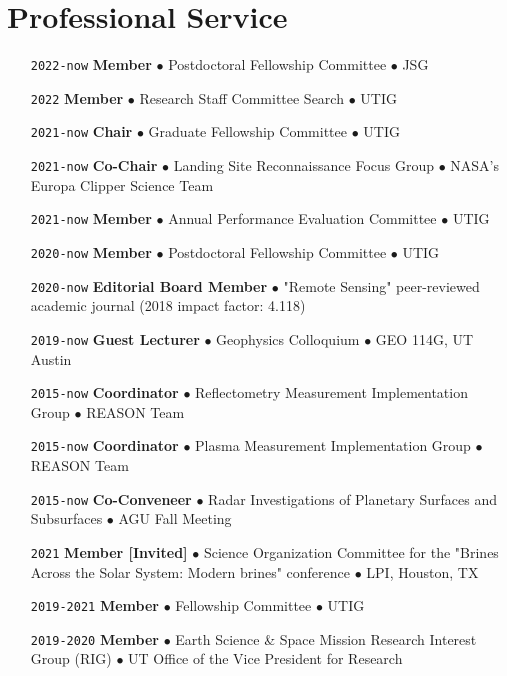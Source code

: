 \section*{Professional Service}

\begin{itemize}[leftmargin=5.8em, labelsep=1.5em]
    \setlength\itemsep{-.5em}
    \item[\texttt{2022-now}] \textbf{Member} $\bullet$ Postdoctoral Fellowship Committee $\bullet$ JSG
    \item[\texttt{2022}] \textbf{Member} $\bullet$ Research Staff Committee Search $\bullet$ UTIG
    \item[\texttt{2021-now}] \textbf{Chair} $\bullet$ Graduate Fellowship Committee $\bullet$ UTIG
    \item[\texttt{2021-now}] \textbf{Co-Chair} $\bullet$ Landing Site Reconnaissance Focus Group  $\bullet$ NASA's Europa Clipper Science Team
    \item[\texttt{2021-now}] \textbf{Member} $\bullet$ Annual Performance Evaluation Committee $\bullet$ UTIG
    \item[\texttt{2020-now}] \textbf{Member} $\bullet$ Postdoctoral Fellowship Committee $\bullet$ UTIG
    \item[\texttt{2020-now}] \textbf{Editorial Board Member} $\bullet$ "Remote Sensing" peer-reviewed academic journal (2018 impact factor: 4.118)
    \item[\texttt{2019-now}] \textbf{Guest Lecturer} $\bullet$ Geophysics Colloquium $\bullet$  GEO 114G, UT Austin
    \item[\texttt{2015-now}] \textbf{Coordinator} $\bullet$ Reflectometry Measurement Implementation Group $\bullet$ REASON Team
    \item[\texttt{2015-now}] \textbf{Coordinator} $\bullet$ Plasma Measurement Implementation Group $\bullet$ REASON Team
    \item[\texttt{2015-now}] \textbf{Co-Conveneer} $\bullet$  Radar Investigations of Planetary Surfaces and Subsurfaces $\bullet$ AGU Fall Meeting
    \item[\texttt{2021}] \textbf{Member [Invited]} $\bullet$ Science Organization Committee for the "Brines Across the Solar System: Modern brines" conference $\bullet$ LPI, Houston, TX
    \item[\texttt{2019-2021}] \textbf{Member} $\bullet$ Fellowship Committee $\bullet$ UTIG
    \item[\texttt{2019-2020}] \textbf{Member} $\bullet$ Earth Science \& Space Mission Research Interest Group (RIG) $\bullet$ UT Office of the Vice President for Research

\end{itemize}
